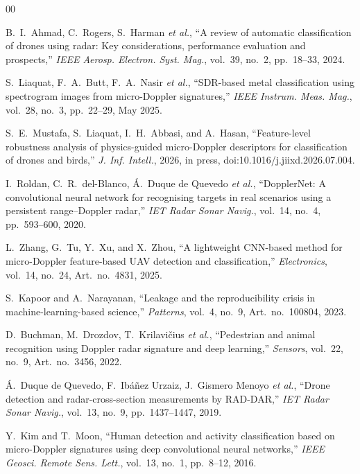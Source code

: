 \documentclass{ICIC2026}
\begin{document}
\begin{thebibliography}{00}

 B.~I.~Ahmad, C.~Rogers, S.~Harman \emph{et al.}, ``A review of automatic classification of drones using radar: Key considerations, performance evaluation and prospects,'' \emph{IEEE Aerosp. Electron. Syst. Mag.}, vol.~39, no.~2, pp.~18--33, 2024.

 S.~Liaquat, F.~A.~Butt, F.~A.~Nasir \emph{et al.}, ``SDR-based metal classification using spectrogram images from micro-Doppler signatures,'' \emph{IEEE Instrum. Meas. Mag.}, vol.~28, no.~3, pp.~22--29, May 2025.

 S.~E.~Mustafa, S.~Liaquat, I.~H.~Abbasi, and A.~Hasan, ``Feature-level robustness analysis of physics-guided micro-Doppler descriptors for classification of drones and birds,'' \emph{J. Inf. Intell.}, 2026, in press, doi:10.1016/j.jiixd.2026.07.004.

 I.~Roldan, C.~R.~del-Blanco, \'A.~Duque de Quevedo \emph{et al.}, ``DopplerNet: A convolutional neural network for recognising targets in real scenarios using a persistent range--Doppler radar,'' \emph{IET Radar Sonar Navig.}, vol.~14, no.~4, pp.~593--600, 2020.

 L.~Zhang, G.~Tu, Y.~Xu, and X.~Zhou, ``A lightweight CNN-based method for micro-Doppler feature-based UAV detection and classification,'' \emph{Electronics}, vol.~14, no.~24, Art.~no.~4831, 2025.

 S.~Kapoor and A.~Narayanan, ``Leakage and the reproducibility crisis in machine-learning-based science,'' \emph{Patterns}, vol.~4, no.~9, Art.~no.~100804, 2023.

 D.~Buchman, M.~Drozdov, T.~Krilavi\v{c}ius \emph{et al.}, ``Pedestrian and animal recognition using Doppler radar signature and deep learning,'' \emph{Sensors}, vol.~22, no.~9, Art.~no.~3456, 2022.

 \'A.~Duque de Quevedo, F.~Ib\'a\~nez Urzaiz, J.~Gismero Menoyo \emph{et al.}, ``Drone detection and radar-cross-section measurements by RAD-DAR,'' \emph{IET Radar Sonar Navig.}, vol.~13, no.~9, pp.~1437--1447, 2019.

 Y.~Kim and T.~Moon, ``Human detection and activity classification based on micro-Doppler signatures using deep convolutional neural networks,'' \emph{IEEE Geosci. Remote Sens. Lett.}, vol.~13, no.~1, pp.~8--12, 2016.




\end{thebibliography}
\end{document}
